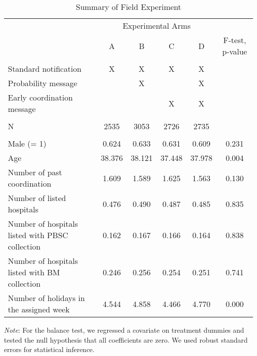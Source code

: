 \documentclass[12pt, a4paper]{article}
\begin{document}
\begin{table}

\caption{\label{tab:summary}Summary of Field Experiment}
\centering
\fontsize{9}{11}\selectfont
\begin{threeparttable}
\begin{tabular}[t]{lccccc}
\toprule
\multicolumn{1}{c}{ } & \multicolumn{4}{c}{Experimental Arms} & \multicolumn{1}{c}{ } \\
\cmidrule(l{3pt}r{3pt}){2-5}
 & A & B & C & D & F-test, p-value\\
\midrule
\addlinespace[0.3em]
\multicolumn{6}{l}{\textbf{A. Interventions}}\\
\hspace{1em}Standard notification & X & X & X & X & \\
\hspace{1em}Probability message &  & X &  & X & \\
\hspace{1em}Early coordination message &  &  & X & X & \\
\addlinespace[0.3em]
\multicolumn{6}{l}{\textbf{B. Sample Size}}\\
\hspace{1em}N & 2535 & 3053 & 2726 & 2735 & \\
\addlinespace[0.3em]
\multicolumn{6}{l}{\textbf{C. Balance Test}}\\
\hspace{1em}Male (= 1) & 0.624 & 0.633 & 0.631 & 0.609 & 0.231\\
\hspace{1em}Age & 38.376 & 38.121 & 37.448 & 37.978 & 0.004\\
\hspace{1em}Number of past coordination & 1.609 & 1.589 & 1.625 & 1.563 & 0.130\\
\hspace{1em}Number of listed hospitals & 0.476 & 0.490 & 0.487 & 0.485 & 0.835\\
\hspace{1em}Number of hospitals listed with PBSC collection & 0.162 & 0.167 & 0.166 & 0.164 & 0.838\\
\hspace{1em}Number of hospitals listed with BM collection & 0.246 & 0.256 & 0.254 & 0.251 & 0.741\\
\hspace{1em}Number of holidays in the assigned week & 4.544 & 4.858 & 4.466 & 4.770 & 0.000\\
\bottomrule
\end{tabular}
\begin{tablenotes}
\item \emph{Note}: For the balance test, we regressed a covariate on treatment dummies and tested the null hypothesis that all coefficients are zero. We used robust standard errors for statistical inference.
\end{tablenotes}
\end{threeparttable}
\end{table}
\end{document}
